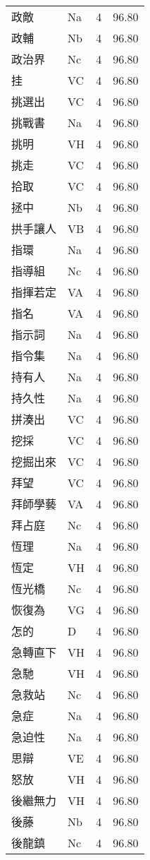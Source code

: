 \documentclass[twocolumn]{book}
\begin{document}
\begin{supertabular}{llrr}
政敵 & Na & 4 &  96.80\\
政輔 & Nb & 4 &  96.80\\
政治界 & Nc & 4 &  96.80\\
挂 & VC & 4 &  96.80\\
挑選出 & VC & 4 &  96.80\\
挑戰書 & Na & 4 &  96.80\\
挑明 & VH & 4 &  96.80\\
挑走 & VC & 4 &  96.80\\
拾取 & VC & 4 &  96.80\\
拯中 & Nb & 4 &  96.80\\
拱手讓人 & VB & 4 &  96.80\\
指環 & Na & 4 &  96.80\\
指導組 & Nc & 4 &  96.80\\
指揮若定 & VA & 4 &  96.80\\
指名 & VA & 4 &  96.80\\
指示詞 & Na & 4 &  96.80\\
指令集 & Na & 4 &  96.80\\
持有人 & Na & 4 &  96.80\\
持久性 & Na & 4 &  96.80\\
拼湊出 & VC & 4 &  96.80\\
挖採 & VC & 4 &  96.80\\
挖掘出來 & VC & 4 &  96.80\\
拜望 & VC & 4 &  96.80\\
拜師學藝 & VA & 4 &  96.80\\
拜占庭 & Nc & 4 &  96.80\\
恆理 & Na & 4 &  96.80\\
恆定 & VH & 4 &  96.80\\
恆光橋 & Nc & 4 &  96.80\\
恢復為 & VG & 4 &  96.80\\
怎的 & D & 4 &  96.80\\
急轉直下 & VH & 4 &  96.80\\
急馳 & VH & 4 &  96.80\\
急救站 & Nc & 4 &  96.80\\
急症 & Na & 4 &  96.80\\
急迫性 & Na & 4 &  96.80\\
思辯 & VE & 4 &  96.80\\
怒放 & VH & 4 &  96.80\\
後繼無力 & VH & 4 &  96.80\\
後藤 & Nb & 4 &  96.80\\
後龍鎮 & Nc & 4 &  96.80\\

\end{supertabular}
\end{document}
